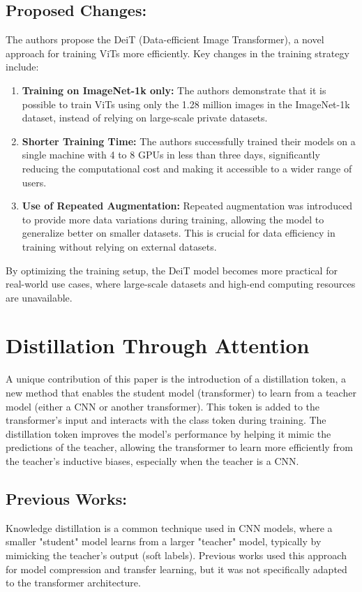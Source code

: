 \documentclass{report}
\begin{document}
	\subsection{Proposed Changes:}
	The authors propose the DeiT (Data-efficient Image Transformer), a novel approach for training ViTs more efficiently. Key changes in the training strategy include:
	\begin{enumerate}
		\item 
		\textbf{Training on ImageNet-1k only:} The authors demonstrate that it is possible to train ViTs using only the 1.28 million images in the ImageNet-1k dataset, instead of relying on large-scale private datasets.
		
		\item 
		\textbf{Shorter Training Time:} The authors successfully trained their models on a single machine with 4 to 8 GPUs in less than three days, significantly reducing the computational cost and making it accessible to a wider range of users.
		
		\item 
		\textbf{Use of Repeated Augmentation:} Repeated augmentation was introduced to provide more data variations during training, allowing the model to generalize better on smaller datasets. This is crucial for data efficiency in training without relying on external datasets.
	\end{enumerate}
	By optimizing the training setup, the DeiT model becomes more practical for real-world use cases, where large-scale datasets and high-end computing resources are unavailable.
	
	
	
	
	
	
	
	\section{Distillation Through Attention}
	A unique contribution of this paper is the introduction of a distillation token, a new method that enables the student model (transformer) to learn from a teacher model (either a CNN or another transformer). This token is added to the transformer’s input and interacts with the class token during training. The distillation token improves the model's performance by helping it mimic the predictions of the teacher, allowing the transformer to learn more efficiently from the teacher’s inductive biases, especially when the teacher is a CNN.
	
	\subsection{Previous Works:}
	Knowledge distillation is a common technique used in CNN models, where a smaller "student" model learns from a larger "teacher" model, typically by mimicking the teacher's output (soft labels). Previous works used this approach for model compression and transfer learning, but it was not specifically adapted to the transformer architecture.
	
\end{document}
